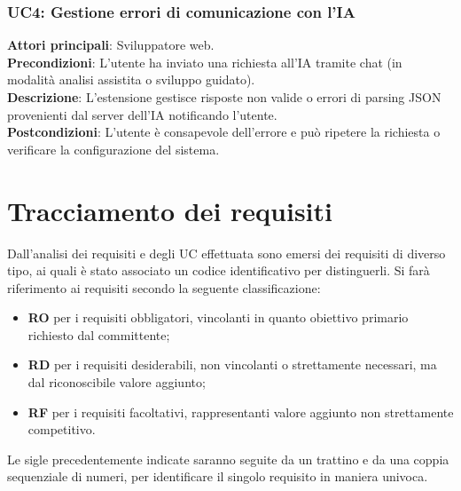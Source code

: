 \subsubsection*{UC4: Gestione errori di comunicazione con l’IA}
\noindent \textbf{Attori principali}: Sviluppatore web.\\
\textbf{Precondizioni}: L’utente ha inviato una richiesta all’IA tramite chat (in modalità analisi assistita o sviluppo guidato).\\
\textbf{Descrizione}: L’estensione gestisce risposte non valide o errori di parsing JSON provenienti dal server dell’IA notificando l’utente.\\
\textbf{Postcondizioni}: L’utente è consapevole dell’errore e può ripetere la richiesta o verificare la configurazione del sistema.\\


\section{Tracciamento dei requisiti}
\label{sec:req}
\noindent Dall’analisi dei requisiti e degli UC effettuata sono emersi dei requisiti di diverso tipo, ai quali è stato associato un codice identificativo per distinguerli. Si farà riferimento ai requisiti secondo la seguente classificazione:
\begin{itemize}
    \item \textbf{RO} per i requisiti obbligatori, vincolanti in quanto obiettivo primario richiesto dal committente;
    \item \textbf{RD} per i requisiti desiderabili, non vincolanti o strettamente necessari, ma dal riconoscibile valore aggiunto;
    \item \textbf{RF} per i requisiti facoltativi, rappresentanti valore aggiunto non strettamente competitivo.
\end{itemize}

\noindent Le sigle precedentemente indicate saranno seguite da un trattino e da una coppia sequenziale di numeri, per identificare il singolo requisito in maniera univoca.

